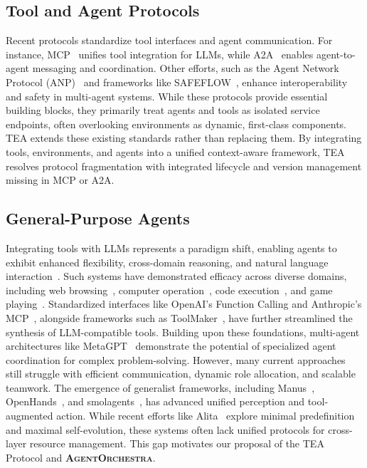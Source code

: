 \documentclass[11pt]{article}
\newcommand{\projectname}{\textbf{\textsc{AgentOrchestra}}\xspace}
\begin{document}
\subsection{Tool and Agent Protocols}
Recent protocols standardize tool interfaces and agent communication. For instance, MCP~\citep{anthropic2024mcp} unifies tool integration for LLMs, while A2A~\citep{google2024a2a} enables agent-to-agent messaging and coordination. Other efforts, such as the Agent Network Protocol (ANP)~\citep{ehtesham2025survey} and frameworks like SAFEFLOW~\citep{li2025safeflow}, enhance interoperability and safety in multi-agent systems. While these protocols provide essential building blocks, they primarily treat agents and tools as isolated service endpoints, often overlooking environments as dynamic, first-class components. TEA extends these existing standards rather than replacing them. By integrating tools, environments, and agents into a unified context-aware framework, TEA resolves protocol fragmentation with integrated lifecycle and version management missing in MCP or A2A.

\subsection{General-Purpose Agents}
Integrating tools with LLMs represents a paradigm shift, enabling agents to exhibit enhanced flexibility, cross-domain reasoning, and natural language interaction~\citep{liang2025llm}. Such systems have demonstrated efficacy across diverse domains, including web browsing~\citep{openai2025operator, browser_use2024}, computer operation~\citep{anthropic2024computeruse, qin2025ui}, code execution~\citep{wang2024executablecodeactionselicit}, and game playing~\citep{wang2023voyager, tan2024cradle}. Standardized interfaces like OpenAI's Function Calling and Anthropic's MCP~\citep{openai2023functioncalling, anthropic2024mcp}, alongside frameworks such as ToolMaker~\citep{wolflein2025llm}, have further streamlined the synthesis of LLM-compatible tools. Building upon these foundations, multi-agent architectures like MetaGPT~\citep{hong2023metagpt} demonstrate the potential of specialized agent coordination for complex problem-solving. However, many current approaches still struggle with efficient communication, dynamic role allocation, and scalable teamwork. The emergence of generalist frameworks, including Manus~\citep{shen2025mindmachinerisemanus}, OpenHands~\citep{wang2024openhands}, and smolagents~\citep{smolagents2025}, has advanced unified perception and tool-augmented action. While recent efforts like Alita~\citep{qiu2025alitageneralistagentenabling} explore minimal predefinition and maximal self-evolution, these systems often lack unified protocols for cross-layer resource management. This gap motivates our proposal of the TEA Protocol and \projectname.
\end{document}

